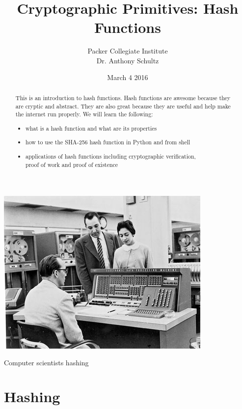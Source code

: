 \documentclass{tufte-handout}
\title{Cryptographic Primitives: Hash Functions }
\author[Packer]{Packer Collegiate Institute\\Dr. Anthony Schultz}
\date{March 4 2016} %
\begin{document}
\maketitle%
\begin{marginfigure}[-50pt]%
  \includegraphics[width=\linewidth]{IBM.jpg}
  \caption{Computer scientists hashing }
  \label{fig:marginfig}
\end{marginfigure}
\begin{abstract}
\noindent
This is an introduction to hash functions.  Hash functions are awesome because they are cryptic and abstract.  They are also great because they are useful and help make the internet run properly.   We will learn the following: 
\begin{itemize}
\item what is a hash function and what are its properties
\item how to use the SHA-256 hash function in Python and from shell
 \item applications of hash functions including cryptographic verification, \\proof of work and proof of existence
 \end{itemize} \end{abstract}

\normalsize


\section{Hashing}
\end{document}
